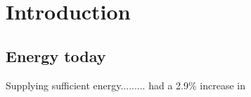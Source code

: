 \chapter{Introduction} \label{ch:introduction}

\section{Energy today}
Supplying sufficient energy......... \citep{Worldenergydata} had a 2.9\% increase in 


